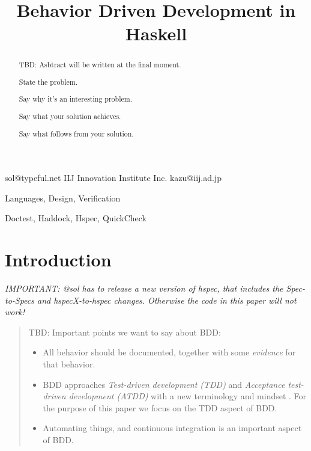 \documentclass[preprint]{sigplanconf}
\newcommand{\hspec}{Hspec}
\newcommand{\doctest}{Doctest}
\begin{document}
\copyrightdata{[to be supplied]}


\title{Behavior Driven Development in Haskell}

           {}
           {sol@typeful.net}
           {IIJ Innovation Institute Inc.}
           {kazu@iij.ad.jp}

\maketitle

\begin{abstract}

TBD: Asbtract will be written at the final moment.

State the problem.

Say why it’s an interesting problem.

Say what your solution achieves.

Say what follows from your solution.

\end{abstract}


\terms Languages, Design, Verification

\keywords \doctest{}, Haddock, \hspec{}, QuickCheck

\section{Introduction}

\emph{IMPORTANT: @sol has to release a new version of hspec, that
includes the Spec-to-Specs and hspecX-to-hspec changes.  Otherwise the
code in this paper will not work!}

\begin{quote}
    TBD: Important points we want to say about BDD:
    \begin{itemize}
        \item
            All behavior should be documented, together with some
            \emph{evidence} for that behavior.
        \item
            BDD approaches \emph{Test-driven development (TDD)} and
            \emph{Acceptance test-driven development (ATDD)} with a new
            terminology and mindset .  For the purpose of this paper we focus
            on the TDD aspect of BDD.
        \item
            Automating things, and continuous integration is an important
            aspect of BDD.
    \end{itemize}
\end{quote}
\end{document}
